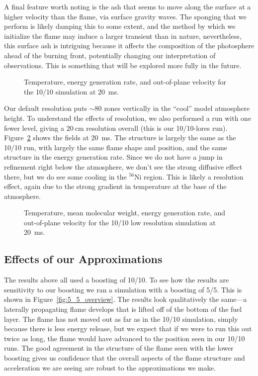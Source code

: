 \documentclass[preprint,times,tighten]{aastex63}
\newcommand{\isot}[2]{$^{#2}\mathrm{#1}$}
\newcommand{\MarginPar}[1]{
    \marginpar{\vskip-\baselineskip%
               \raggedright%
               \tiny\sffamily%
               {\color{red}\hrule%
               \smallskip%
               #1\par%
               \smallskip%
               \hrule}}%
}
\begin{document}
A final feature worth noting is the ash that seems to move along the
surface at a higher velocity than the flame, via surface gravity
waves.  The sponging that we perform is likely damping this to some extent, and
the method by which we initialize the flame may induce a larger
transient than in nature, nevertheless, this surface ash is intriguing
because it affects the composition of the photosphere ahead of the
burning front, potentially changing our interpretation of
observations.  This is something that will be explored more fully in
the future.

\begin{figure}[h]
\centering
{}
\caption{\label{fig:10_10_overview} Temperature, energy generation rate, and out-of-plane velocity for the 10/10 simulation at 20~ms.}
\end{figure}


Our default resolution puts $\sim 80$ zones vertically in the
``cool'' \MarginPar{double check} model atmosphere height.  To
understand the effects of resolution, we also performed a run with one
fewer level, giving a $20~\mbox{cm}$ resolution overall (this is our
10/10-lores run).  Figure~\ref{fig:10_10_lowres} shows the fields at
20~ms.  The structure is largely the same as the 10/10 run, with
largely the same flame shape and position, and the same structure in
the energy generation rate.  Since we do not have a jump in refinement
right below the atmosphere, we don't see the strong diffusive effect
there, but we do see some cooling in the \isot{Ni}{56} region.  This
is likely a resolution effect, again due to the strong gradient in
temperature at the base of the atmosphere.


\begin{figure}[h]
\centering
{}
\caption{\label{fig:10_10_lowres} Temperature, mean molecular weight,
  energy generation rate, and out-of-plane velocity for the 10/10 low
  resolution simulation at 20~ms.}
\end{figure}




\subsection{Effects of our Approximations}

The results above all used a boosting of 10/10.  To see how the
results are sensitivity to our boosting we ran a simulation with a
boosting of 5/5.  This is shown in Figure~\ref{fig:5_5_overview}.  The
results look qualitatively the same---a laterally propagating flame
develops that is lifted off of the bottom of the fuel layer.  The
flame has not moved out as far as in the 10/10 simulation, simply
because there is less energy release, but we expect that if we were to
run this out twice as long, the flame would have advanced to the
position seen in our 10/10 runs.  The good agreement in the structure
of the flame seen with the lower boosting gives us confidence that the
overall aspects of the flame structure and acceleration we are seeing
are robust to the approximations we make.
\end{document}
